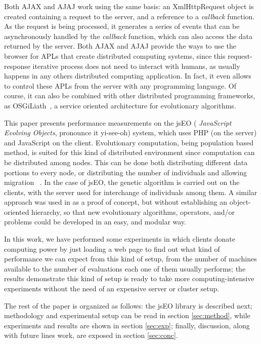 \documentclass[runningheads,a4paper]{llncs}
\begin{document}
Both AJAX and AJAJ work using the same basis: an {\sf XmlHttpRequest} object is created  containing a request to the server, and a reference to a {\em callback} function. 
As the request is being processed, it generates a series of events that can be asynchronously handled by the {\em callback} function, which can also access the data returned by the server.
Both AJAX and AJAJ provide the ways to use the browser for APLs that create distributed computing systems, since this request-response iterative process does not need to interact with humans, as usually happens in any others distributed computing application.
In fact, it even allows to control these APLs from the server with any programming
language. Of course, it can also be combined with other distributed
programming frameworks, as OSGiLiath~\cite{DBLP:journals/soco/Garcia-SanchezGCAG13}, a service oriented architecture for evolutionary algorithms.


This paper presents performance measurements on the jsEO ({\em
  JavaScript Evolving Objects}, pronounce it yi-see-oh) system, which uses PHP 
 (on the server) and JavaScript on the client. Evolutionary computation, being population based method, is suited for this
kind of distributed environment since computation can be distributed among nodes. This can be done both distributing different data portions to every node, or distributing the number of individuals and allowing migration ~\cite{cantu-paz:migration-policies}. In the case of jsEO, the genetic algorithm is carried out  on the clients,
with the server used  for interchange of individuals among
them. A similar approach was used in \cite{agajaj} as a proof of concept, but without establishing an object-oriented hierarchy, so that new evolutionary algorithms, operators, and/or problems could be developed in an easy, and modular way.

In this work, we have performed some experiments in which clients donate
computing power by just loading a web page to find out what kind of
performance we can expect from this kind of setup, from the number of
machines available to the number of evaluations each one of them
usually performs; the results demonstrate this kind of setup is ready to take more
computing-intensive experiments without the need of an expensive server or cluster
setup. 



The rest of the paper is organized as follows: the jsEO library is described next;  methodology and experimental setup can be read  in section \ref{sec:method}, while experiments and results are shown in section 
\ref{sec:exp}; finally, discussion, along with future lines work, are exposed in section \ref{sec:conc}.
\end{document}
